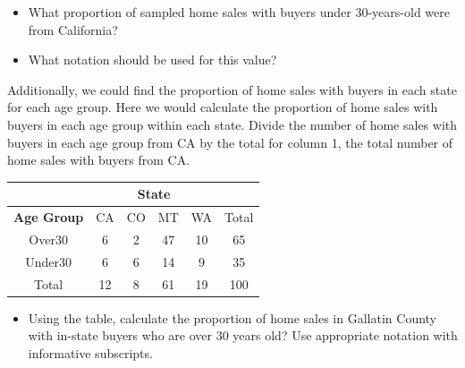 \documentclass[
]{report}
\providecommand{\tightlist}{%
  \setlength{\itemsep}{0pt}\setlength{\parskip}{0pt}}
\begin{document}

\begin{itemize}
\tightlist
\item
  What proportion of sampled home sales with buyers under 30-years-old were from California?
\end{itemize}

\vspace{0.3in}

\begin{itemize}
\tightlist
\item
  What notation should be used for this value?
\end{itemize}

\vspace{0.2in}


Additionally, we could find the proportion of home sales with buyers in each state for each age group. Here we would calculate the proportion of home sales with buyers in each age group within each state. Divide the number of home sales with buyers in each age group from CA by the total for column 1, the total number of home sales with buyers from CA.


\begin{center}
\begingroup
\setlength{\tabcolsep}{14pt} %
\renewcommand{\arraystretch}{2} %
\begin{tabular}{|c|c|c|c|c|c|}
\hline
 & \multicolumn{4}{|c|}{\textbf{State}} & \\ \hline
\textbf{Age Group} & CA & CO & MT & WA & Total \\ \hline
 Over30 & 6 & 2 & 47 & 10 & 65 \\ \hline
 Under30 & 6 & 6 & 14 & 9 & 35 \\ \hline
 Total & 12 & 8 & 61 & 19 & 100\\ \hline
\end{tabular}
\endgroup
\end{center}

\begin{itemize}
\tightlist
\item
  Using the table, calculate the proportion of home sales in Gallatin County with in-state buyers who are over 30 years old? Use appropriate notation with informative subscripts.
\end{itemize}

\vspace{0.4in}
\end{document}
